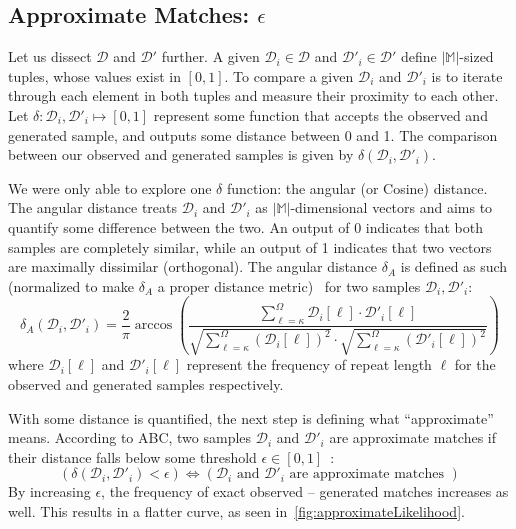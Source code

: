 \subsection{Approximate Matches: $\epsilon$}\label{subsec:approximateMatches}
Let us dissect $\mathcal{D}$ and $\mathcal{D}'$ further.
A given $\mathcal{D}_i \in \mathcal{D}$ and $\mathcal{D}'_i \in \mathcal{D}'$ define $| \mathbb{M} |$-sized tuples,
whose values exist in $[0, 1]$.
To compare a given $\mathcal{D}_i$ and $\mathcal{D}'_i$ is to iterate through each element in both tuples and measure
their proximity to each other.
Let $\delta : \mathcal{D}_i,\mathcal{D}'_i \mapsto [0, 1]$ represent some function that accepts the observed and
generated sample, and outputs some distance between 0 and 1.
The comparison between our observed and generated samples is given by $\delta(\mathcal{D}_i, \mathcal{D}'_i)$.

We were only able to explore one $\delta$ function: the angular (or Cosine) distance.
The angular distance treats $\mathcal{D}_i$ and $\mathcal{D}'_i$ as $| \mathbb{M} |$-dimensional vectors
and aims to quantify some difference between the two.
An output of 0 indicates that both samples are completely similar, while an output of 1 indicates that two vectors
are maximally dissimilar (orthogonal).
The angular distance $\delta_A$ is defined as such (normalized to make $\delta_A$ a proper distance
metric)~\cite{chaComprehensiveSurveyDistance2007a} for two samples $\mathcal{D}_i, \mathcal{D}'_i$:
\begin{equation}
    \delta_A(\mathcal{D}_i, \mathcal{D}'_i) = \frac{2}{\pi} \arccos \left(
    \frac{\sum_{\ell=\kappa}^{\Omega} \mathcal{D}_i[\ell] \cdot \mathcal{D}'_i[\ell]}{
        \sqrt{\sum_{\ell=\kappa}^{\Omega} \left(\mathcal{D}_i[\ell]\right)^2} \cdot
        \sqrt{\sum_{\ell=\kappa}^{\Omega} \left(\mathcal{D}'_i[\ell]\right)^2}
    } \right)
\end{equation}
where $\mathcal{D}_i[\ell]$ and $\mathcal{D}'_i[\ell]$ represent the frequency of repeat length $\ell$ for the observed
and generated samples respectively.

With some distance is quantified, the next step is defining what ``approximate'' means.
According to ABC, two samples $\mathcal{D}_i$ and $\mathcal{D}'_i$ are approximate matches if their distance falls below
some threshold $\epsilon \in [0, 1]$~\cite{marjoramMarkovChainMonte2003}:
\begin{equation}
    \left(\delta(\mathcal{D}_i, \mathcal{D}'_i) < \epsilon \right) \Leftrightarrow
    \left(\mathcal{D}_i \text { and } \mathcal{D}'_i
    \text{ are approximate matches } \right)
\end{equation}
By increasing $\epsilon$, the frequency of exact observed -- generated matches increases as well.
This results in a flatter curve, as seen in~\autoref{fig:approximateLikelihood}.

